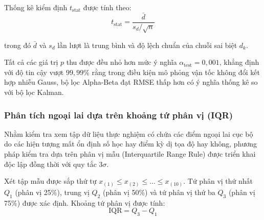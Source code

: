 Thống kê kiểm định $t_{\text{stat}}$ được tính theo:
\begin{equation}
t_{\text{stat}} = \frac{\bar{d}}{s_d / \sqrt{n}}
\label{eq:t-stat}
\end{equation}

trong đó $\bar{d}$ và $s_d$ lần lượt là trung bình và độ lệch chuẩn của chuỗi sai biệt $d_k$.

\begin{table}[H]
\centering
\caption{Kết quả kiểm định Student theo cặp so sánh Alpha-Beta và Kalman ($n=10$)}
\label{tab:paired-t-test}
\end{table}

Tất cả các giá trị $p$ thu được đều nhỏ hơn mức ý nghĩa $\alpha_{\text{test}} = 0{,}001$, khẳng định với độ tin cậy vượt $99{,}99\%$ rằng trong điều kiện mô phỏng vận tốc không đổi kết hợp nhiễu Gauss, bộ lọc Alpha-Beta đạt RMSE thấp hơn có ý nghĩa thống kê so với bộ lọc Kalman.

\subsubsection{Phân tích ngoại lai dựa trên khoảng tứ phân vị (IQR)}

\hspace{0.5cm} Nhằm kiểm tra xem tập dữ liệu thực nghiệm có chứa các điểm ngoại lai cục bộ do các hiện tượng mất ổn định số học hay điểm kỳ dị tọa độ hay không, phương pháp kiểm tra dựa trên phân vị mẫu (Interquartile Range Rule) được triển khai độc lập đồng thời với quy tắc $3\sigma$.

Xét tập mẫu được sắp thứ tự $x_{(1)} \le x_{(2)} \le \dots \le x_{(10)}$. Tứ phân vị thứ nhất $Q_1$ (phân vị 25\%), trung vị $Q_2$ (phân vị 50\%) và tứ phân vị thứ ba $Q_3$ (phân vị 75\%) được xác định. Khoảng tứ phân vị được tính:
\begin{equation}
\text{IQR} = Q_3 - Q_1
\label{eq:iqr}
\end{equation}

